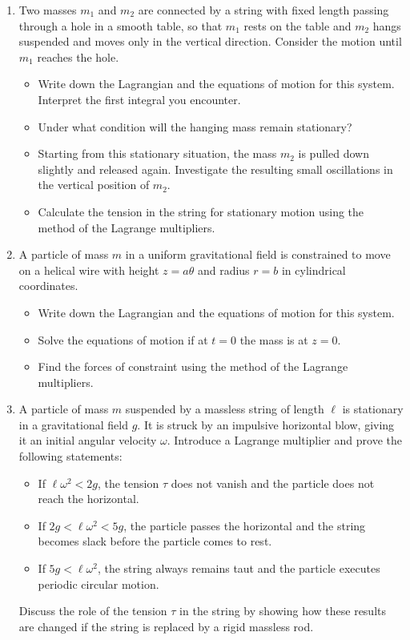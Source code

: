 \documentclass[letterpaper,11pt]{article}
\begin{document}
\begin{enumerate}
 \item Two masses $m_1$ and $m_2$ are connected by a string with fixed length passing through a hole in a smooth table, so that $m_1$ rests on the table and $m_2$ hangs suspended and moves only in the vertical direction.  Consider the motion until $m_1$ reaches the hole.
 \begin{itemize}
  \item Write down the Lagrangian and the equations of motion for this system. Interpret the first integral you encounter.
  \item Under what condition will the hanging mass remain stationary?
  \item Starting from this stationary situation, the mass $m_2$ is pulled down slightly and released again. Investigate the resulting small oscillations in the vertical position of $m_2$.
  \item Calculate the tension in the string for stationary motion using the method of the Lagrange multipliers.
 \end{itemize}
 \item A particle of mass $m$ in a uniform gravitational field is constrained to move on a helical wire with height $z = a\theta$ and radius $r = b$ in cylindrical coordinates.
 \begin{itemize}
  \item Write down the Lagrangian and the equations of motion for this system.
  \item Solve the equations of motion if at $t = 0$ the mass is at $z = 0$.
  \item Find the forces of constraint using the method of the Lagrange multipliers.
 \end{itemize}
 \item A particle of mass $m$ suspended by a massless string of length $\ell$ is stationary in a gravitational field $g$.  It is struck by an impulsive horizontal blow, giving it an initial angular velocity $\omega$.  Introduce a Lagrange multiplier and prove the following statements:
 \begin{itemize}
  \item If $\ell\omega^2 < 2g$, the tension $\tau$ does not vanish and the particle does not reach the horizontal.
  \item If $2g < \ell\omega^2 < 5g$, the particle passes the horizontal and the string becomes slack before the particle comes to rest.
  \item If $5g < \ell\omega^2$, the string always remains taut and the particle executes periodic circular motion.
 \end{itemize}
 Discuss the role of the tension $\tau$ in the string by showing how these results are changed if the string is replaced by a rigid massless rod.
\end{enumerate}
\end{document}

